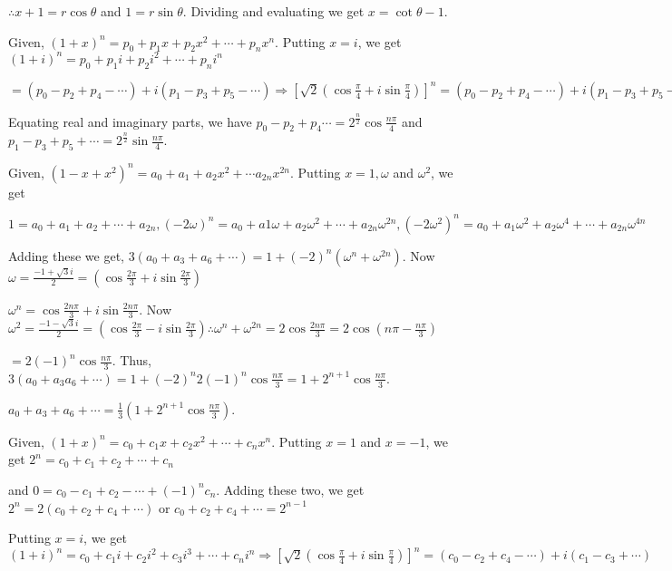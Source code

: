   $\therefore x + 1 = r \cos\theta$ and $1 = r \sin\theta$. Dividing and evaluating we get $x = \cot\theta -
  1$.
\item Given, $(1 + x)^n = p_0 + p_1x + p_2x^2 + \cdots + p_nx^n$. Putting $x = i$, we get $(1 + i)^n = p_0 + p_1i + p_2i^2 + \cdots + p_ni^n$

  $= (p_0 - p_2 + p_4 - \cdots) + i(p_1 - p_3 + p_5 - \cdots)\Rightarrow \left[\sqrt{2}\left(\cos\frac{\pi}{4} +
  i\sin\frac{\pi}{4}\right)\right]^n = (p_0 - p_2 + p_4 - \cdots) + i(p_1 - p_3 + p_5 - \cdots)$

  Equating real and imaginary parts, we have $p_0 - p_2 + p_4 \cdots = 2^{\frac{n}{2}}\cos\frac{n\pi}{4}$ and
  $p_1 - p_3 + p_5 + \cdots = 2^{\frac{n}{2}}\sin\frac{n\pi}{4}$.
\item Given, $(1 - x + x^2)^n = a_0 + a_1 + a_2x^2 + \cdots a_{2n}x^{2n}$. Putting $x = 1, \omega$ and $\omega^2$, we get

  $1 = a_0 + a_1 + a_2 + \cdots + a_{2n}, (-2\omega)^n = a_0 + a1\omega + a_2\omega^2 + \cdots +
  a_{2n}\omega^{2n}, (-2\omega^2)^n = a_0 + a_1\omega^2 + a_2\omega^4 + \cdots +
  a_{2n}\omega^{4n}$

  Adding these we get, $3(a_0 + a_3 + a_6 + \cdots) = 1 + (-2)^n(\omega^n + \omega^{2n})$. Now $\omega =
  \frac{-1 + \sqrt{3}i}{2} = \left(\cos\frac{2\pi}{3} + i\sin \frac{2\pi}{3}\right)$

  $\omega^n = \cos\frac{2n\pi}{3} + i\sin\frac{2n\pi}{3}$. Now $\omega^2 = \frac{-1 - \sqrt{3}i}{2} =
  \left(\cos\frac{2\pi}{3} - i\sin \frac{2\pi}{3}\right)\therefore \omega^n + \omega^{2n} =
  2\cos\frac{2n\pi}{3} = 2\cos\left(n\pi - \frac{n\pi}{3}\right)$

  $= 2(-1)^n\cos\frac{n\pi}{3}$. Thus, $3(a_0 + a_3  a_6 + \cdots) = 1 + (-2)^n2(-1)^n\cos\frac{n\pi}{3} = 1 +2^{n + 1}\cos\frac{n\pi}{3}$.

  $a_0 + a_3 + a_6 + \cdots = \frac{1}{3}\left(1 + 2^{n+1}\cos\frac{n\pi}{3}\right)$.
\item Given, $(1 + x)^n = c_0 + c_1x + c_2x^2 + \cdots + c_nx^n$. Putting $x = 1$ and $x = -1$, we get $2^n = c_0 + c_1 + c_2 + \cdots + c_n$

  and $0 = c_0 - c_1 + c_2 - \cdots + (-1)^nc_n$. Adding these two, we get $2^n = 2(c_0 + c_2 + c_4 +
  \cdots)$ or $c_0 + c_2 + c_4 + \cdots = 2^{n - 1}$

  Putting $x = i$, we get $(1 + i)^n = c_0 + c_1i + c_2i^2 + c_3i^3 + \cdots + c_ni^n\Rightarrow
  \left[\sqrt{2}\left(\cos\frac{\pi}{4}+i\sin\frac{\pi}{4}\right)\right]^n = (c_0 -c_2 + c_4 - \cdots) +
  i(c_1 - c_3 + \cdots)$

